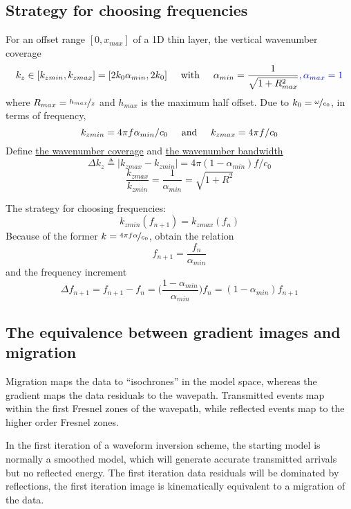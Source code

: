 \documentclass{article}
\newcommand{\prf}{This is relative path from \Papth to the paper file}
\newcommand{\pmk}{This is the brief info.}
\newcommand{\pti}{This is the paper tile}
\newcommand{\pay}{These are authors and year}
\newcommand{\pjo}{This is the journal}
\newcommand{\pda}{This is the date}
\newcommand{\myem}[1]{{\color{red}\uline{#1}}}
\newcommand{\myno}[1]{{\color{blue}#1}}
\newcommand{\etal}{\textit{et al.}}
\begin{document}
\subsection{Strategy for choosing frequencies}
For an offset range $[0,x_{max}]$ of a 1D thin layer, the vertical wavenumber coverage
\[ k_z\in[k_{zmin},k_{zmax}]=[2k_0\alpha_{min},2k_0] \text{\hspace{5mm}with\hspace{5mm}} \alpha_{min}=\frac{1}{\sqrt{1+R_{max}^2}}\myno{,\alpha_{max}=1} \]
where $R_{max}=\nicefrac{h_{max}}{z}$ and $h_{max}$ is the maximum half offset. Due to $k_0=\nicefrac{\omega}{c_0}$, in terms of frequency,
\[ k_{zmin}=4\pi f\alpha_{min}/c_0 \text{\hspace{5mm}and\hspace{5mm}} k_{zmax}=4\pi f/c_0 \]
Define \myem{the wavenumber coverage} and \myem{the wavenumber bandwidth}
\[ \Delta k_z\triangleq|k_{zmax}-k_{zmin}|=4\pi(1-\alpha_{min})f/c_0 \]
\[ \frac{k_{zmax}}{k_{zmin}}=\frac{1}{\alpha_{min}}=\sqrt{1+R^2} \]\par
The strategy for choosing frequencies:
\[ k_{zmin}(f_{n+1})=k_{zmax}(f_n) \]
Because of the former $k=\nicefrac{4\pi f\alpha}{c_0}$, obtain the relation
\[ f_{n+1}=\frac{f_n}{\alpha_{min}} \]
and the frequency increment
\[ \Delta f_{n+1}=f_{n+1}-f_n=\Big(\frac{1-\alpha_{min}}{\alpha_{min}}\Big)f_n=(1-\alpha_{min})f_{n+1} \]\par
\subsection{The equivalence between gradient images and migration}
Migration maps the data to ``isochrones'' in the model space, whereas the gradient maps the data residuals to the wavepath. Transmitted events map within the first Fresnel zones of the wavepath, while reflected events map to the higher order Fresnel zones.\par
In the first iteration of a waveform inversion scheme, the starting model is normally a smoothed model, which will generate accurate transmitted arrivals but no reflected energy. The first iteration data residuals will be dominated by reflections, the first iteration image is kinematically equivalent to a migration of the data.\par
\vspace{5mm}

\renewcommand{\pmk}{Plessix\_2010\_SEG\_Application to land data set}
\renewcommand{\prf}{FWI/\pmk.pdf}
\renewcommand{\pti}{Application of acoustic full waveform inversion to a low-frequency large-offset land data set}
\renewcommand{\pay}{Ren\'{e}-Edouard Plessix, Guido Baeten and Jan Willem de Maag \etal, 2010}
\renewcommand{\pjo}{SEG 2010 Annual Meeting}
\renewcommand{\pda}{2016/10/3 Mon.}
\end{document}
